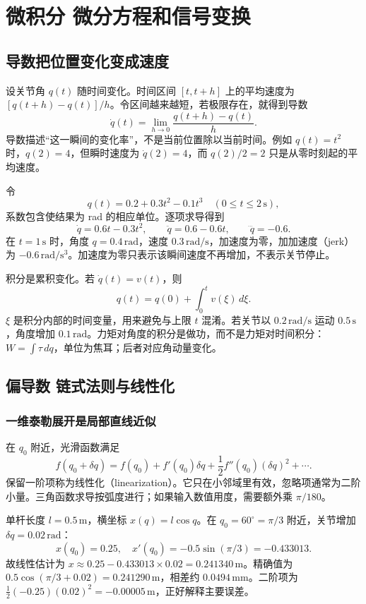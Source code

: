 \chapter{微积分 微分方程和信号变换}\label{ch:calculus}
\section{导数把位置变化变成速度}
设关节角 $q(t)$ 随时间变化。时间区间 $[t,t+h]$ 上的平均速度为 $[q(t+h)-q(t)]/h$。令区间越来越短，若极限存在，就得到导数
\begin{equation}
 \dot q(t)=\lim_{h\to0}\frac{q(t+h)-q(t)}{h}.
\end{equation}
导数描述“这一瞬间的变化率”，不是当前位置除以当前时间。例如 $q(t)=t^2$ 时，$q(2)=4$，但瞬时速度为 $\dot q(2)=4$，而 $q(2)/2=2$ 只是从零时刻起的平均速度。

\begin{examplebox}[算例 从轨迹逐次求导并检查单位]
令
\[
 q(t)=0.2+0.3t^2-0.1t^3\quad(0\le t\le2\,\mathrm s),
\]
系数包含使结果为 rad 的相应单位。逐项求导得到
\[
 \dot q=0.6t-0.3t^2,
 \qquad\ddot q=0.6-0.6t,
 \qquad\dddot q=-0.6.
\]
在 $t=1\,\mathrm s$ 时，角度 $q=0.4\,\mathrm{rad}$，速度 $0.3\,\mathrm{rad/s}$，加速度为零，加加速度（jerk）为 $-0.6\,\mathrm{rad/s^3}$。加速度为零只表示该瞬间速度不再增加，不表示关节停止。
\end{examplebox}

积分是累积变化。若 $\dot q(t)=v(t)$，则
\begin{equation}
 q(t)=q(0)+\int_0^t v(\xi)\,d\xi.
\end{equation}
$\xi$ 是积分内部的时间变量，用来避免与上限 $t$ 混淆。若关节以 $0.2\,\mathrm{rad/s}$ 运动 $0.5\,\mathrm s$，角度增加 $0.1\,\mathrm{rad}$。力矩对角度的积分是做功，而不是力矩对时间积分：$W=\int\tau\,dq$，单位为焦耳；后者对应角动量变化。

\section{偏导数 链式法则与线性化}
\subsection{一维泰勒展开是局部直线近似}
在 $q_0$ 附近，光滑函数满足
\begin{equation}
 f(q_0+\delta q)=f(q_0)+f'(q_0)\delta q
 +\frac12 f''(q_0)(\delta q)^2+\cdots.
\end{equation}
保留一阶项称为线性化（linearization）。它只在小邻域里有效，忽略项通常为二阶小量。三角函数求导按弧度进行；如果输入数值用度，需要额外乘 $\pi/180$。
\begin{examplebox}[算例 用导数估计连杆端点的小位移]
单杆长度 $l=0.5\,\mathrm m$，横坐标 $x(q)=l\cos q$。在 $q_0=60^\circ=\pi/3$ 附近，关节增加 $\delta q=0.02\,\mathrm{rad}$：
\[
 x(q_0)=0.25,\quad x'(q_0)=-0.5\sin(\pi/3)=-0.433013.
\]
故线性估计为 $x\approx0.25-0.433013\times0.02=0.241340\,\mathrm m$。精确值为 $0.5\cos(\pi/3+0.02)=0.241290\,\mathrm m$，相差约 $0.0494\,\mathrm{mm}$。二阶项为 $\frac12(-0.25)(0.02)^2=-0.00005\,\mathrm m$，正好解释主要误差。
\end{examplebox}

